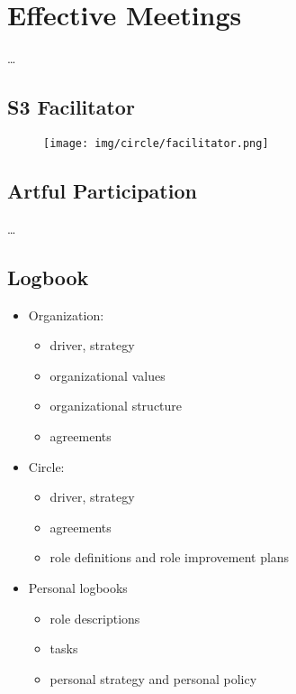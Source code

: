 \chapter{Effective Meetings}
\label{effectivemeetings}

{\ldots}

\section{S3 Facilitator}
\label{s3facilitator}

\begin{figure}[htbp]
\centering
\texttt{[image: img/circle/facilitator.png]}
\end{figure}

\section{Artful Participation}
\label{artfulparticipation}

{\ldots}

\section{Logbook}
\label{logbook}

\begin{itemize}
\item Organization:

\begin{itemize}
\item driver, strategy

\item organizational values

\item organizational structure

\item agreements

\end{itemize}

\item Circle:

\begin{itemize}
\item driver, strategy

\item agreements

\item role definitions and role improvement plans

\end{itemize}

\item Personal logbooks

\begin{itemize}
\item role descriptions

\item tasks

\item personal strategy and personal policy

\end{itemize}

\end{itemize}

